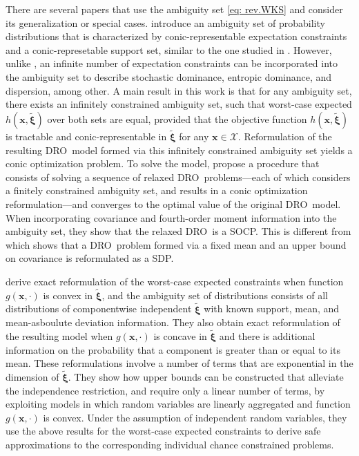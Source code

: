 \documentclass[final,onefignum,onetabnum]{class}
\newcommand{\bs}[1]{\boldsymbol{#1}} %
\newcommand{\Cs}[1]{\mathcal{#1}} %
\newcommand{\txi}{\tilde{\bs{\xi}}}
\newcommand{\dro}{DRO}
\begin{document}



There are several papers that use the ambiguity set \eqref{eq: rev.WKS} and consider its generalization or special cases. 
\citet{chen2018infinite}  introduce an ambiguity set of probability distributions that is characterized by  conic-representable expectation constraints and a conic-represetable support set, similar to the one studied in \citet{wiesemann2014}. However, unlike \citet{wiesemann2014}, an infinite number of expectation constraints can be incorporated into the ambiguity set to describe  stochastic dominance, entropic dominance, and dispersion, among other. A main result in this work is that  for 
any ambiguity set, there exists an  infinitely constrained ambiguity set, such that worst-case expected $h(\bs{x}, \txi)$ over both sets are equal,  provided that the objective
function $h(\bs{x}, \txi)$ is  tractable and conic-representable in $\txi$ for any $\bs{x} \in \Cs{X}$. 
Reformulation of the resulting \dro\ model formed via this infinitely constrained ambiguity set yields a conic optimization problem. 
To solve the model, \citet{chen2018infinite} propose a procedure that consists of solving a sequence of  relaxed \dro\ problems---each of which considers a finitely constrained ambiguity set, and  results in a conic optimization reformulation---and converges to the optimal value of the original \dro\ model. When incorporating covariance and fourth-order moment information into the ambiguity set, they
show that the relaxed \dro\ is a SOCP. This is different from \citet{delage2010} which  shows that a \dro\ problem formed via a fixed mean and an upper bound on covariance  is  reformulated as a SDP. 





\citet{postek2018} derive exact reformulation of the worst-case expected constraints when function   $g(\bs{x}, \cdot)$ is convex in $\txi$, and the ambiguity set of distributions consists of all distributions of componentwise independent $\txi$ with known support, mean, and mean-asboulute deviation information. They also obtain exact reformulation of the resulting model when     $g(\bs{x}, \cdot)$ is concave in $\txi$ and there is additional information on the probability that a component is greater than or  equal to its mean. These reformulations involve a number of terms that are exponential in the dimension of $\txi$. They
show how upper bounds can be constructed that alleviate the independence restriction,
and require only a linear number of terms, by exploiting models in which random variables are linearly aggregated and function $g(\bs{x}, \cdot)$ is convex. Under the assumption of independent random variables, they use the above results for the worst-case expected constraints to derive safe approximations to the corresponding individual chance constrained problems.  
\end{document}
